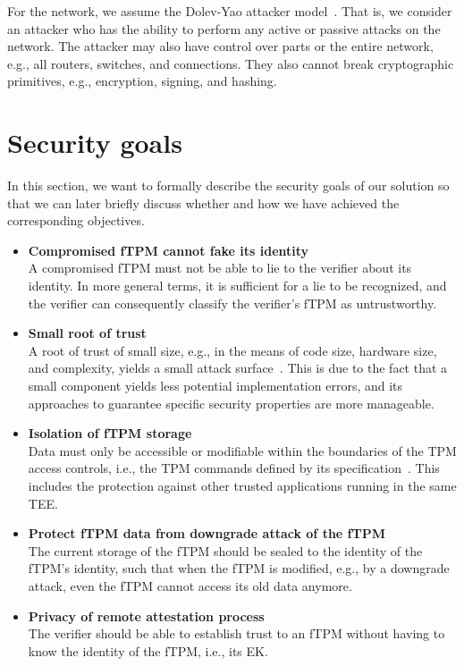For the network, we assume the Dolev-Yao attacker model~\cite{Dolev1983}.
That is, we consider an attacker who has the ability to perform any active or passive attacks on the network.
The attacker may also have control over parts or the entire network, e.g., all routers, switches, and connections.
They also cannot break cryptographic primitives, e.g., encryption, signing, and hashing.

\section{Security goals}

In this section, we want to formally describe the security goals of our solution so that we can later briefly discuss whether and how we have achieved the corresponding objectives.

\begin{itemize}
  \item{\textbf{Compromised fTPM cannot fake its identity}\\
  A compromised fTPM must not be able to lie to the verifier about its identity.
  In more general terms, it is sufficient for a lie to be recognized, and the verifier can consequently classify the verifier's fTPM as untrustworthy.}

  \item{\textbf{Small root of trust}\\
  A root of trust of small size, e.g., in the means of code size, hardware size, and complexity, yields a small attack surface~\cite{Singaravelu2006}.
  This is due to the fact that a small component yields less potential implementation errors, and its approaches to guarantee specific security properties are more manageable.}
  
  \item{\textbf{Isolation of fTPM storage}\\
  Data must only be accessible or modifiable within the boundaries of the TPM access controls, i.e., the TPM commands defined by its specification~\cite{tpm}.}
  This includes the protection against other trusted applications running in the same TEE\@.
  
  \item{\textbf{Protect fTPM data from downgrade attack of the fTPM}\\
  The current storage of the fTPM should be sealed to the identity of the fTPM's identity, such that when the fTPM is modified, e.g., by a downgrade attack, even the fTPM cannot access its old data anymore.}

  \item{\textbf{Privacy of remote attestation process}\\
  The verifier should be able to establish trust to an fTPM without having to know the identity of the fTPM, i.e., its EK\@.}
\end{itemize}

